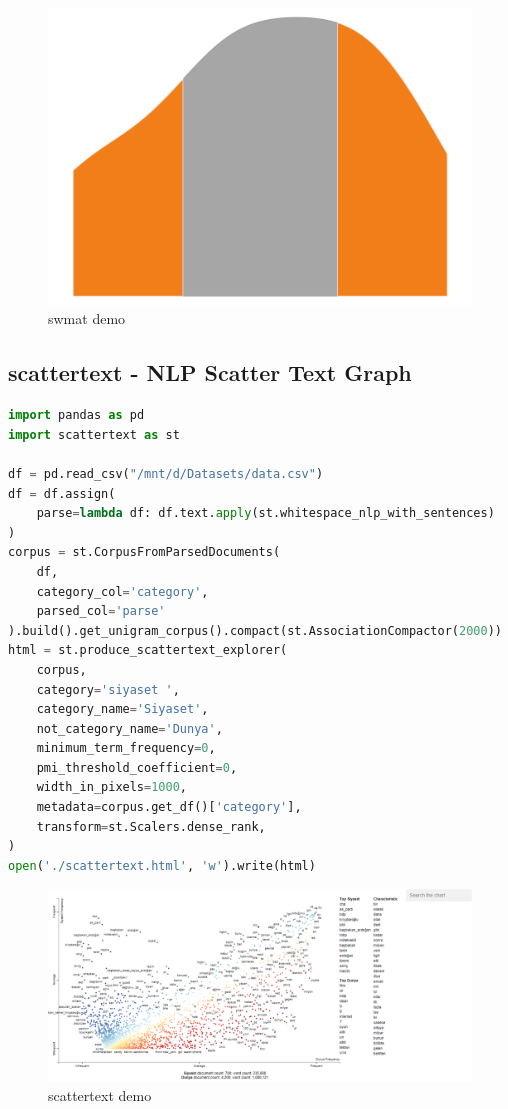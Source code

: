 \begin{figure}[ht]
    \centering
    \includegraphics[width=1.0\textwidth]{images/swmat.png}
    \caption{swmat demo}
    \label{fig:enter-label}
\end{figure}

\newpage

\subsection{scattertext - NLP Scatter Text Graph}
\begin{lstlisting}[language=Python]
import pandas as pd
import scattertext as st

df = pd.read_csv("/mnt/d/Datasets/data.csv")
df = df.assign(
    parse=lambda df: df.text.apply(st.whitespace_nlp_with_sentences)
)
corpus = st.CorpusFromParsedDocuments(
    df, 
    category_col='category', 
    parsed_col='parse'
).build().get_unigram_corpus().compact(st.AssociationCompactor(2000))
html = st.produce_scattertext_explorer(
    corpus,
    category='siyaset ',
    category_name='Siyaset',
    not_category_name='Dunya',
    minimum_term_frequency=0, 
    pmi_threshold_coefficient=0,
    width_in_pixels=1000, 
    metadata=corpus.get_df()['category'],
    transform=st.Scalers.dense_rank,
)
open('./scattertext.html', 'w').write(html)
\end{lstlisting}

\begin{figure}[ht]
    \centering
    \includegraphics[width=1.0\textwidth]{images/scattertext.png}
    \caption{scattertext demo}
    \label{fig:enter-label}
\end{figure}

